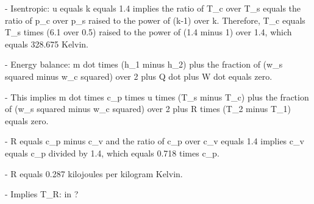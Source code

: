- Isentropic: u equals k equals 1.4 implies the ratio of T_c over T_s equals the ratio of p_c over p_s raised to the power of (k-1) over k. Therefore, T_c equals T_s times (6.1 over 0.5) raised to the power of (1.4 minus 1) over 1.4, which equals 328.675 Kelvin.

- Energy balance: m dot times (h_1 minus h_2) plus the fraction of (w_s squared minus w_c squared) over 2 plus Q dot plus W dot equals zero.

- This implies m dot times c_p times u times (T_s minus T_c) plus the fraction of (w_s squared minus w_c squared) over 2 plus R times (T_2 minus T_1) equals zero.

- R equals c_p minus c_v and the ratio of c_p over c_v equals 1.4 implies c_v equals c_p divided by 1.4, which equals 0.718 times c_p.

- R equals 0.287 kilojoules per kilogram Kelvin.

- Implies T_R: in ?